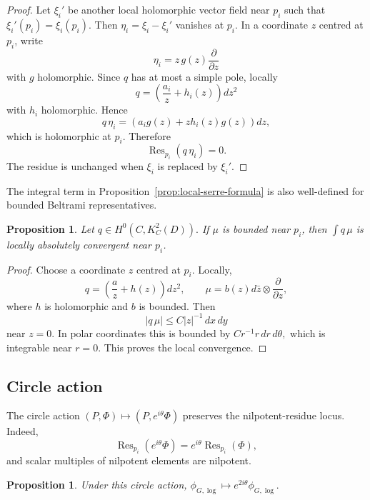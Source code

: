 \documentclass[11pt,reqno]{amsart}
\numberwithin{equation}{section}
\theoremstyle{plain}
\newtheorem{proposition}[theorem]{Proposition}
\theoremstyle{definition}
\theoremstyle{remark}
\begin{document}
\begin{proof}
Let \(\xi_i'\) be another local holomorphic vector field near \(p_i\) such that
\(
        \xi_i'(p_i)=\xi_i(p_i).
\)
Then
\(
        \eta_i=\xi_i-\xi_i'
\)
vanishes at \(p_i\). In a coordinate \(z\) centred at \(p_i\), write
\[
        \eta_i=z\,g(z)\frac{\partial}{\partial z}
\]
with \(g\) holomorphic. Since \(q\) has at most a simple pole, locally
\[
        q=
        \left(
        \frac{a_i}{z}+h_i(z)
        \right)dz^2
\]
with \(h_i\) holomorphic. Hence
\[
        q\,\eta_i
        =
        \left(
        a_i g(z)+z h_i(z)g(z)
        \right)dz,
\]
which is holomorphic at \(p_i\). Therefore
\[
        \operatorname{Res}_{p_i}(q\,\eta_i)=0.
\]
The residue is unchanged when \(\xi_i\) is replaced by \(\xi_i'\).
\end{proof}

The integral term in Proposition~\ref{prop:local-serre-formula} is also
well-defined for bounded Beltrami representatives.

\begin{proposition}
\label{prop:local-convergence}
Let
\(
        q\in H^0(C,K_C^2(D)).
\)
If \(\mu\) is bounded near \(p_i\), then
\(
        \int q\,\mu
\)
is locally absolutely convergent near \(p_i\).
\end{proposition}

\begin{proof}
Choose a coordinate \(z\) centred at \(p_i\). Locally,
\[
        q=
        \left(
        \frac{a}{z}+h(z)
        \right)dz^2,
        \qquad
        \mu=
        b(z)d\bar z\otimes\frac{\partial}{\partial z},
\]
where \(h\) is holomorphic and \(b\) is bounded. Then
\[
        |q\,\mu|
        \leq
        C|z|^{-1}\,dx\,dy
\]
near \(z=0\). In polar coordinates this is bounded by
\(
        C r^{-1}r\,dr\,d\theta,
\)
which is integrable near \(r=0\).  This proves the local convergence.
\end{proof}


\subsection{Circle action}

The circle action
\(
        (P,\Phi)\longmapsto (P,e^{i\theta}\Phi)
\)
preserves the nilpotent-residue locus. Indeed,
\[
        \operatorname{Res}_{p_i}(e^{i\theta}\Phi)
        =
        e^{i\theta}\operatorname{Res}_{p_i}(\Phi),
\]
and scalar multiples of nilpotent elements are nilpotent.

\begin{proposition}
\label{prop:circle-weight-log}
Under this circle action,
\(
        \phi_{G,\log}
        \longmapsto
        e^{2i\theta}\phi_{G,\log}.
\)
\end{proposition}
\end{document}

